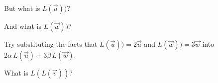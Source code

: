 \documentclass{ximera}
\begin{document}
\begin{question}
\begin{solution}
\begin{hint}
\begin{question}
\begin{solution}
          \begin{multiple-choice}
          \end{multiple-choice} 
        \end{solution}
      \end{question}
    \end{hint}

    \begin{hint}
      \begin{question}
        \begin{solution}
          But what is $L(\vec{u}))$?

          \begin{multiple-choice}
          \end{multiple-choice} 
        \end{solution}
      \end{question}
    \end{hint}

    \begin{hint}
      \begin{question}
        \begin{solution}
          And what is $L(\vec{w}))$?

          \begin{multiple-choice}
          \end{multiple-choice} 
        \end{solution}
      \end{question}
    \end{hint}

    \begin{hint}
      Try substituting the facts that $L(\vec{u})) = 2 \vec{u}$ and $L(\vec{w})) = 3 \vec{w}$ into $2\alpha\,L(\vec{u}) + 3\beta\,L(\vec{w})$.
    \end{hint}

    What is $L(L(\vec{v}))$?
    \begin{multiple-choice}
    \end{multiple-choice} 
  \end{solution}


\end{question}
\end{document}
